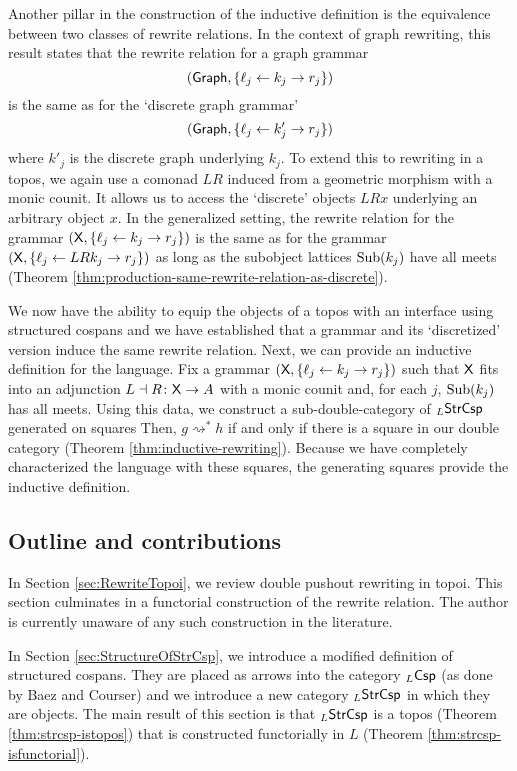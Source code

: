 \documentclass{amsart}
\begin{document}
Another pillar in the construction of the inductive
definition is the equivalence between two classes of rewrite
relations.  In the context of graph rewriting, this result
states that the rewrite relation for a graph grammar
$$(\mathsf{Graph} , \{ \ell_j \leftarrow k_j \to r_j\})$$ is the same as for the `discrete graph
grammar'
$$( \mathsf{Graph} , \{ \ell_j \leftarrow k'_j \to r_j\})$$ where $ k'_j $ is the discrete graph
underlying $ k_j $.  To extend this to rewriting
in a topos, we again use a comonad $ LR $ induced
from a geometric morphism with a monic counit. It
allows us to access the `discrete' objects
$ LRx $ underlying an arbitrary object $ x $.  In
the generalized setting, the rewrite relation for
the grammar
$ ( \mathsf{X}, \{ \ell_j \leftarrow k_j \to r_j\}) $
is the same as for the grammar
$ (\mathsf{X} , \{ \ell_j \leftarrow LR k_j \to r_j\}) $ as long as the subobject lattices
$ \operatorname{Sub} (k_j) $ have all meets (Theorem
\ref{thm:production-same-rewrite-relation-as-discrete}).

We now have the ability to equip the objects of a
topos with an interface using structured cospans
and we have established that a grammar and its
`discretized' version induce the same rewrite relation.
Next, we can provide an inductive definition for
the language. Fix a grammar
$ (\mathsf{X}, \{ \ell_j \leftarrow k_j \to r_j\}) $
such that $ \mathsf{X} $ fits into an adjunction
$ L \dashv R \colon \mathsf{X} \to A $ with a monic counit
and, for each $ j $, $ \operatorname{Sub} (k_j) $ has all meets.
Using this data, we construct a
sub-double-category of $ _L\mathsf{StrCsp} $ generated on
squares 
Then, $ g \rightsquigarrow^\ast h$ if and only
if there is a square
 in our double
category (Theorem \ref{thm:inductive-rewriting}).
Because we have completely characterized the
language with these squares, the generating
squares provide the inductive definition. 

\subsection{Outline and contributions}
\label{sec:outl-contr}

In Section \ref{sec:RewriteTopoi}, we review
double pushout rewriting in topoi. This section
culminates in a functorial construction of the
rewrite relation.  The author is currently unaware
of any such construction in the literature.

In Section \ref{sec:StructureOfStrCsp}, we
introduce a modified definition of structured
cospans. They are placed as arrows into the
category $ _L\mathsf{Csp} $ (as done by Baez and Courser)
and we introduce a new category $ _L\mathsf{StrCsp} $ in
which they are objects. The main result of this
section is that $ _L\mathsf{StrCsp} $ is a topos (Theorem
\ref{thm:strcsp-istopos}) that is
constructed functorially in $ L $ (Theorem
\ref{thm:strcsp-isfunctorial}).
\end{document}
